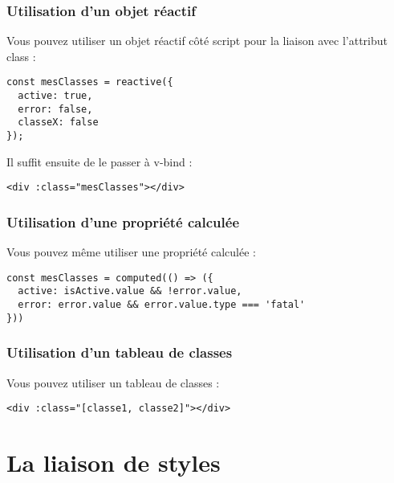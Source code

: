 \subsubsection{Utilisation d'un objet réactif}
Vous pouvez utiliser un objet réactif côté {\color{monOrange}script} pour la liaison avec l'attribut {\color{monOrange}class} :
\begin{verbatim}
const mesClasses = reactive({
  active: true,
  error: false,
  classeX: false
});
\end{verbatim}
Il suffit ensuite de le passer à {\color{monOrange}v-bind} :
\begin{verbatim}
<div :class="mesClasses"></div>
\end{verbatim}

\subsubsection{Utilisation d'une propriété calculée}
Vous pouvez même utiliser une propriété calculée :
\begin{verbatim}
const mesClasses = computed(() => ({
  active: isActive.value && !error.value,
  error: error.value && error.value.type === 'fatal'
}))
\end{verbatim}


\subsubsection{Utilisation d'un tableau de classes}
Vous pouvez utiliser un tableau de classes :
\begin{verbatim}
<div :class="[classe1, classe2]"></div>
\end{verbatim}


\section{La liaison de styles}
